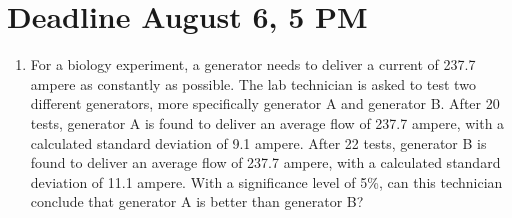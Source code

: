 \documentclass[a4paper,12pt]{CURSUS}
\newcommand{\BN}{\begin{enumerate}}
\newcommand{\EN}{\end{enumerate}}
\begin{document}
\addtocounter{chapter}{-1}
\renewcommand{\chaptername}{Practice Class Assignment}
\chapter{Deadline August 6, 5 PM}

 \BN

 \item

 For a biology experiment, a generator needs to deliver a current of
237.7 ampere as constantly as possible.
The lab technician is asked to test two different generators,
more specifically generator A and generator B.
After 20 tests, generator A is found to deliver an average flow
of 237.7 ampere, with a calculated standard
deviation of 9.1 ampere.
After 22 tests, generator B is found to deliver an average flow
of 237.7 ampere, with a calculated standard
deviation of 11.1 ampere.
With a significance level of 5\%, can this
technician conclude that generator A is better than
generator B?

 \EN
\end{document}

